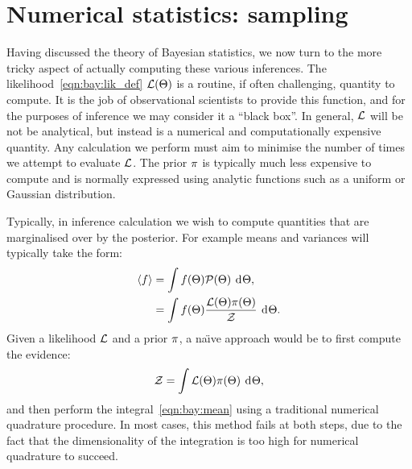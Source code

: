 \section{Numerical statistics: sampling}
\label{sec:bay:samp}
Having discussed the theory of Bayesian statistics, we now turn to the more tricky aspect of actually computing these various inferences. The likelihood~\eqref{eqn:bay:lik_def} \(\mathcal{L}(\Theta)\) is a routine, if often challenging, quantity to compute. It is the job of observational scientists to provide this function, and for the purposes of inference we may consider it a ``black box''. In general, \(\mathcal{L}\) will be not be analytical, but instead is a numerical and computationally expensive quantity. Any calculation we perform must aim to minimise the number of times we attempt to evaluate \(\mathcal{L}\). The prior \(\pi\) is typically much less expensive to compute and is normally expressed using analytic functions such as a uniform or Gaussian distribution.

Typically, in inference calculation we wish to compute quantities that are marginalised over by the posterior. For example means and variances will typically take the form:
\begin{align}
  {\left\langle{f}\right\rangle} 
  &= \int f(\Theta)\mathcal{P}(\Theta)\:\operatorname{d}^{}\!{\Theta},
  \label{eqn:bay:mean}\\
  &= \int f(\Theta)\frac{\mathcal{L}(\Theta)\pi(\Theta)}{\mathcal{Z}}\:\operatorname{d}^{}\!{\Theta}.
\end{align}
Given a likelihood \(\mathcal{L}\) and a prior \(\pi\), a na\"{\i}ve approach would be to first compute the evidence:
\begin{equation}
  \mathcal{Z} = \int \mathcal{L}(\Theta) \pi(\Theta) \: \operatorname{d}^{}\!{\Theta},
  \label{eqn:bay:ev_short}
\end{equation}
and then perform the integral~\eqref{eqn:bay:mean} using a traditional numerical quadrature procedure. In most cases, this method fails at both steps, due to the fact that the dimensionality of the integration is too high for numerical quadrature to succeed.


